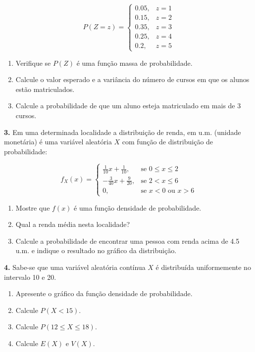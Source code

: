 \documentclass[
]{book}
\providecommand{\tightlist}{%
  \setlength{\itemsep}{0pt}\setlength{\parskip}{0pt}}
\begin{document}
\[P(Z = z) =
\begin{cases}
0.05, & z = 1 \\
0.15, & z = 2 \\
0.35, & z = 3 \\
0.25, & z = 4 \\
0.2, & z = 5
\end{cases}\]

\begin{enumerate}
\def\labelenumi{(\alph{enumi})}
\item
  Verifique se \(P(Z)\) é uma função massa de probabilidade.
\item
  Calcule o valor esperado e a variância do número de cursos em que os alunos estão matriculados.
\item
  Calcule a probabilidade de que um aluno esteja matriculado em mais de 3 cursos.
\end{enumerate}

\textbf{3.} Em uma determinada localidade a distribuição de renda, em u.m. (unidade monetária) é uma variável aleatória \(X\) com função de distribuição de probabilidade:

\[
f_{X}(x) = 
\begin{cases} 
\frac{1}{10}x + \frac{1}{10}, & \text{se } 0 \leq x \leq 2 \\[10pt]
-\frac{3}{40}x + \frac{9}{20}, & \text{se } 2 < x \leq 6 \\[10pt]
0, & \text{se } x < 0 \text{ ou } x > 6
\end{cases}
\]

\begin{enumerate}
\def\labelenumi{(\alph{enumi})}
\tightlist
\item
  Mostre que \(f(x)\) é uma função densidade de probabilidade.
\item
  Qual a renda média nesta localidade?
\item
  Calcule a probabilidade de encontrar uma pessoa com renda acima de 4.5 u.m. e indique o resultado no gráfico da distribuição.
\end{enumerate}

\textbf{4.} Sabe-se que uma variável aleatória contínua \(X\) é distribuída uniformemente no intervalo 10 e 20.

\begin{enumerate}
\def\labelenumi{(\alph{enumi})}
\tightlist
\item
  Apresente o gráfico da função densidade de probabilidade.
\item
  Calcule \(P(X < 15)\).
\item
  Calcule \(P(12\leq X \leq 18)\).
\item
  Calcule \(E(X)\) e \(V(X)\).
\end{enumerate}
\end{document}
